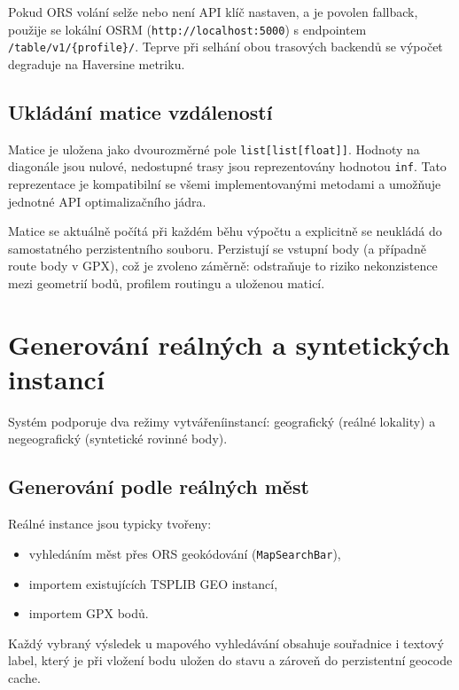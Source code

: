 Pokud ORS volání selže nebo není API klíč nastaven, a je povolen fallback, použije se lokální OSRM (\texttt{http://localhost:5000}) s endpointem \texttt{/table/v1/\{profile\}/}. Teprve při selhání obou trasových backendů se výpočet degraduje na Haversine metriku.



\subsection{Ukládání matice vzdáleností}
Matice je uložena jako dvourozměrné pole \texttt{list[list[float]]}. Hodnoty na diagonále jsou nulové, nedostupné trasy jsou reprezentovány hodnotou \texttt{inf}. Tato reprezentace je kompatibilní se všemi implementovanými metodami a umožňuje jednotné API optimalizačního jádra.

Matice se aktuálně počítá při každém běhu výpočtu a explicitně se neukládá do samostatného perzistentního souboru. Perzistují se vstupní body (a případně route body v GPX), což je zvoleno záměrně: odstraňuje to riziko nekonzistence mezi geometrií bodů, profilem routingu a uloženou maticí.

\section{Generování reálných a syntetických instancí}
Systém podporuje dva režimy vytvářeníinstancí: geografický (reálné lokality) a negeografický (syntetické rovinné body).

\subsection{Generování podle reálných měst}
Reálné instance jsou typicky tvořeny:
\begin{itemize}
    \item vyhledáním měst přes ORS geokódování (\texttt{MapSearchBar}),
    \item importem existujících TSPLIB GEO instancí,
    \item importem GPX bodů.
\end{itemize}

Každý vybraný výsledek u mapového vyhledávání obsahuje souřadnice i textový label, který je při vložení bodu uložen do stavu a zároveň do perzistentní geocode cache.

